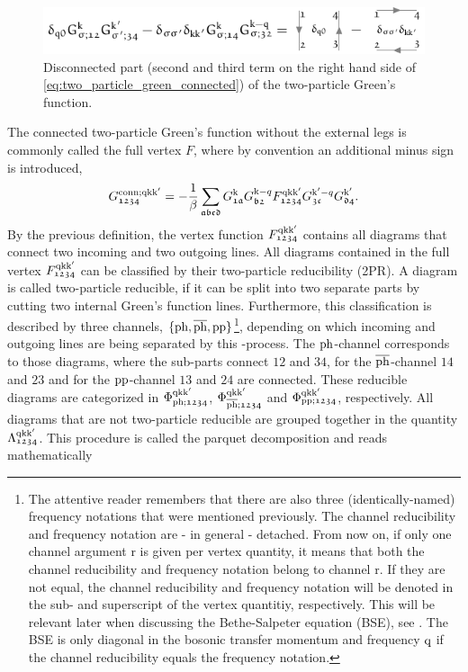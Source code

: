 \documentclass[../../main.tex]{subfiles}
\begin{document}
\begin{figure}[ht!]
	\centering
	\includegraphics[scale=1.2]{../../Graphics/Diagrams/two_particle_green_disconnected/two_particle_green_disconnected}
	\caption{Disconnected part (second and third term on the right hand side of \eqref{eq:two_particle_green_connected}) of the two-particle Green's function.}
	\label{fig:two_particle_green_disconnected}
\end{figure}
The connected two-particle Green's function without the external legs is commonly called the full vertex $F$, where by convention an additional minus sign is introduced,
\begin{align}
	G_{\mathfrak{1234}}^{\text{conn};\text{q}\text{k}\text{k}'} = -\frac1\beta \sum_{\mathfrak{abcd}} G_{\mathfrak{1a}}^{\text{k}} G_{\mathfrak{b2}}^{\text{k}-q} F_{\mathfrak{1234}}^{\text{q}\text{k}\text{k}'} G_{\mathfrak{3c}}^{\text{k}'-q} G_{\mathfrak{d4}}^{\text{k}'}.
\end{align}
By the previous definition, the vertex function $F_{\mathfrak{1234}}^{\text{q}\text{k}\text{k}'}$ contains all diagrams that connect two incoming and two outgoing lines. All diagrams contained in the full vertex $F_{\mathfrak{1234}}^{\text{q}\text{k}\text{k}'}$ can be classified by their two-particle reducibility (2PR). A diagram is called two-particle reducible, if it can be split into two separate parts by cutting two internal Green's function lines. Furthermore, this classification is described by three channels, $\{\text{ph},\overline{\text{ph}},\text{pp}\}$\footnote{The attentive reader remembers that there are also three (identically-named) frequency notations that were mentioned previously. The channel reducibility and frequency notation are - in general - detached. From now on, if only one channel argument r is given per vertex quantity, it means that both the channel reducibility and frequency notation belong to channel r. If they are not equal, the channel reducibility and frequency notation will be denoted in the sub- and superscript of the vertex quantitiy, respectively. This will be relevant later when discussing the Bethe-Salpeter equation (BSE), see . The BSE is only diagonal in the bosonic transfer momentum and frequency $\text{q}$ if the channel reducibility equals the frequency notation.}, depending on which incoming and outgoing lines are being separated by this -process. The $\text{ph}$-channel corresponds to those diagrams, where the sub-parts connect $\mathfrak{12}$ and $\mathfrak{34}$, for the $\overline{\text{ph}}$-channel $\mathfrak{14}$ and $\mathfrak{23}$ and for the $\text{pp}$-channel $\mathfrak{13}$ and $\mathfrak{24}$ are connected. These reducible diagrams are categorized in $\Phi_{\text{ph};\mathfrak{1234}}^{\text{q}\text{k}\text{k}'}$, $\Phi_{\overline{\text{ph}};\mathfrak{1234}}^{\text{q}\text{k}\text{k}'}$ and $\Phi_{\text{pp};\mathfrak{1234}}^{\text{q}\text{k}\text{k}'}$, respectively. All diagrams that are not two-particle reducible are grouped together in the quantity $\Lambda_{\mathfrak{1234}}^{\text{q}\text{k}\text{k}'}$. This procedure is called the parquet decomposition and reads mathematically
\end{document}
